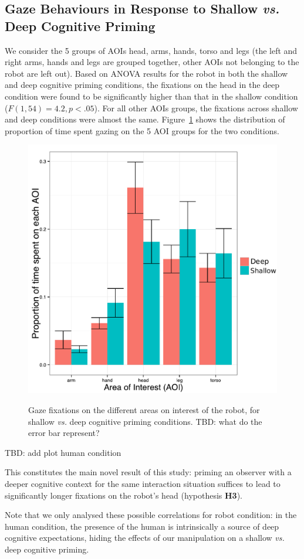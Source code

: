 \documentclass[lettersize, noapacite, twoside, HRI]{apa_HRI}
\newcommand{\vs}{\textit{vs.}\xspace}
\newcommand{\h}[1]{\textbf{H#1}\xspace}
\begin{document}
\subsection{Gaze Behaviours in Response to Shallow \vs Deep Cognitive Priming}

We consider the 5 groups of AOIs {\sf head}, {\sf arms}, {\sf hands}, {\sf
torso} and {\sf legs} (the left and right arms, hands and legs are grouped
together, other AOIs not belonging to the robot are left out). Based on ANOVA results for the robot in both the shallow and deep
cognitive priming conditions, the fixations on the head in the deep condition
were found to be significantly higher than that in the shallow condition
($F(1,54) = 4.2, p < .05$). For all other AOIs groups, the fixations across
shallow and deep conditions were almost the same. Figure~\ref{h3} shows the
distribution of proportion of time spent gazing on the 5 AOI groups for the two
conditions.

\begin{figure}[ht!]
    \centering
    \includegraphics[width=0.6\columnwidth]{GazeHighLow}\label{GazeHighLow}
    \caption{Gaze fixations on the different areas on interest of the robot, for shallow \vs
    deep cognitive priming conditions. TBD: what do the error bar represent?}
    \label{h3}
\end{figure}

TBD: add plot human condition

This constitutes the main novel result of this study: priming an observer with a deeper cognitive
context for the same interaction situation suffices to lead to significantly longer
fixations on the robot's head (hypothesis \h{3}).

Note that we only analysed these possible correlations for robot condition: in
the human condition, the presence of the human is intrinsically a source of deep
cognitive expectations, hiding the effects of our manipulation on a shallow \vs deep
cognitive priming.
\end{document}

